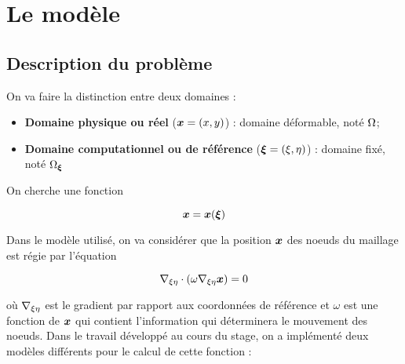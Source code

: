 \section{Le modèle}
\label{sec:modele}

\subsection{Description du problème}

\indent On va faire la distinction entre deux domaines : 

\begin{itemize}
  \item \textbf{Domaine physique ou réel } (\(\boldsymbol{x} =(x,y)\)) : domaine déformable, noté \(\Omega\);
  \item \textbf{Domaine computationnel ou de référence } (\(\boldsymbol{\xi} =(\xi,\eta)\)) : domaine fixé, noté \(\Omega_{\boldsymbol{\xi}}\)
\end{itemize}

\indent On cherche une fonction 

\begin{equation*}
  \boldsymbol{x} = \boldsymbol{x}(\boldsymbol{\xi})
\end{equation*}

\indent Dans le modèle utilisé, on va considérer que la position \(\boldsymbol{x}\) des noeuds du maillage est régie par l'équation

\begin{equation*}
  \nabla_{\xi\eta} \cdot \left( \omega \nabla_{\xi\eta} \boldsymbol{x} \right) = 0
\end{equation*}

\noindent où \(\nabla_{\xi\eta}\) est le gradient par rapport aux coordonnées de référence et \(\omega\) est une fonction de \(\boldsymbol{x}\) qui contient l'information qui déterminera le mouvement des noeuds. Dans le travail développé au cours du stage, on a implémenté deux modèles différents pour le calcul de cette fonction : 

